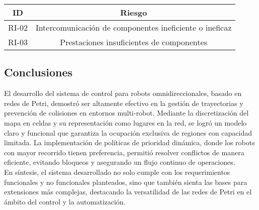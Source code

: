 \begin{center}
    \begin{tabular} {
        | c| c |}
        \hline
            ID & Riesgo \\
        \hline
            RI-02 & Intercomunicación de componentes ineficiente o ineficaz \\
        \hline
            RI-03 & Prestaciones insuficientes de componentes \\
        \hline
    \end{tabular}
\end{center}

\subsection{Conclusiones}
El desarrollo del sistema de control para robots omnidireccionales, basado en redes de Petri, demostró ser altamente efectivo en la gestión de trayectorias y prevención de colisiones en entornos multi-robot. Mediante la discretización del mapa en celdas y su representación como lugares en la red, se logró un modelo claro y funcional que garantiza la ocupación exclusiva de regiones con capacidad limitada. La implementación de políticas de prioridad dinámica, donde los robots con mayor recorrido tienen preferencia, permitió resolver conflictos de manera eficiente, evitando bloqueos y asegurando un flujo continuo de operaciones.\\

En síntesis, el sistema desarrollado no solo cumple con los requerimientos funcionales y no funcionales planteados, sino que también sienta las bases para extensiones más complejas, destacando la versatilidad de las redes de Petri en el ámbito del control y la automatización.